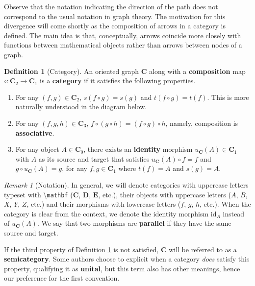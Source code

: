 \documentclass{article}
\theoremstyle{definition}
\newtheorem{defn}[thm]{Definition}
\theoremstyle{remark}
\newtheorem{rem}[thm]{Remark}
\newcommand{\id}{\text{id}}
\begin{document}
Observe that the notation indicating the direction of the path does not correspond to the usual notation in graph theory. The motivation for this divergence will come shortly as the composition of arrows in a category is defined. The main idea is that, conceptually, arrows coincide more closely with functions between mathematical objects rather than arrows between nodes of a graph.
\begin{defn}[Category]\label{defn-cat}
	An oriented graph $\mathbf{C}$ along with a \textbf{composition} map $\circ: \mathbf{C}_2 \rightarrow \mathbf{C}_1$ is a \textbf{category} if it satisfies the following properties.
	\begin{enumerate}
		\item For any $(f, g) \in \mathbf{C}_2$, $s(f \circ g) = s(g)$ and $t(f \circ g) = t(f)$. This is more naturally understood in the diagram below.
		\begin{figure}[h]
			\centering
		\end{figure}
		\item For any $(f,g,h) \in \mathbf{C}_3$, $f\circ(g\circ h) = (f\circ g)\circ h$, namely, composition is \textbf{associative}.
		\item For any object $A \in \mathbf{C}_0$, there exists an \textbf{identity} morphism $u_{\mathbf{C}}(A) \in \mathbf{C}_1$ with $A$ as its source and target that satisfies $u_{\mathbf{C}}(A) \circ f = f$ and $g \circ u_{\mathbf{C}}(A) = g$, for any $f,g \in \mathbf{C}_1$ where $t(f) = A$ and $s(g) = A$.
	\end{enumerate}
\end{defn}
\begin{rem}[Notation]
	In general, we will denote categories with uppercase letters typeset with \textbackslash\texttt{mathbf} ($\mathbf{C}$, $\mathbf{D}$, $\mathbf{E}$, etc.), their objects with uppercase letters ($A$, $B$, $X$, $Y$, $Z$, etc.) and their morphisms with lowercase letters ($f$, $g$, $h$, etc.). When the category is clear from the context, we denote the identity morphism $\id_A$ instead of $u_{\mathbf{C}}(A)$. We say that two morphisms are \textbf{parallel} if they have the same source and target.
\end{rem}
If the third property of Definition \ref{defn-cat} is not satisfied, $\mathbf{C}$ will be referred to as a \textbf{semi\-category}. Some authors choose to explicit when a category \textit{does} satisfy this property, qualifying it as \textbf{unital}, but this term also has other meanings, hence our preference for the first convention.
\end{document}
